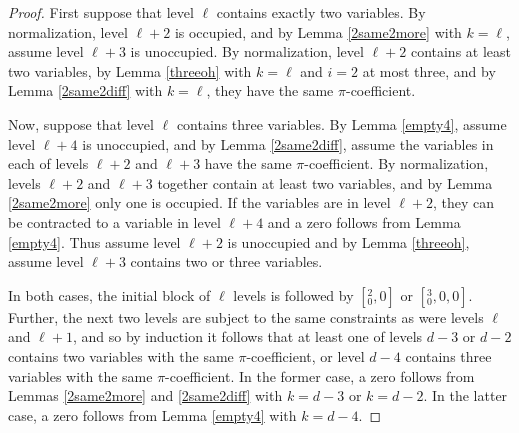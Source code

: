 \documentclass[12pt]{amsart}
\begin{document}
\begin{proof}
First suppose that level $\ell$ contains exactly two variables.  By normalization, level $\ell + 2$ is occupied, and by Lemma \ref{2same2more} with $k = \ell$, assume level $\ell + 3$ is unoccupied.  By normalization, level $\ell + 2$ contains at least two variables, by Lemma \ref{threeoh} with $k = \ell$ and $i=2$ at most three, and by Lemma \ref{2same2diff} with $k = \ell$, they have the same $\pi$-coefficient.  

Now, suppose that level $\ell$ contains three variables.  By Lemma \ref{empty4}, assume level $\ell+4$ is unoccupied, and by Lemma \ref{2same2diff}, assume the variables in each of levels $\ell+2$ and $\ell+3$ have the same $\pi$-coefficient.  By normalization, levels $\ell+2$ and $\ell+3$ together contain at least two variables, and by Lemma \ref{2same2more} only one is occupied.  If the variables are in level $\ell+2$, they can be contracted to a variable in level $\ell+4$ and a zero follows from Lemma \ref{empty4}.  Thus assume level $\ell+2$ is unoccupied and by Lemma \ref{threeoh}, assume level $\ell+3$ contains two or three variables.

In both cases, the initial block of $\ell$ levels is followed by $[{}^2_0, 0]$ or $[{}^3_0,0,0]$.  Further, the next two levels are subject to the same constraints as were levels $\ell$ and $\ell + 1$, and so by induction it follows that at least one of levels $d-3$ or $d-2$ contains two variables with the same $\pi$-coefficient, or level $d-4$ contains three variables with the same $\pi$-coefficient.  In the former case, a zero follows from Lemmas \ref{2same2more} and \ref{2same2diff} with $k = d-3$ or $k=d-2$.  In the latter case, a zero follows from Lemma \ref{empty4} with $k=d-4$.



\end{proof}
\end{document}
